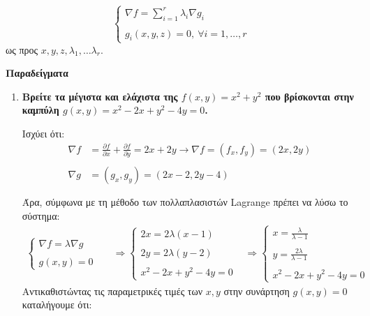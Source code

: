 \[
\begin{cases} 
\nabla f = \sum_{i=1}^{r} \lambda_i \nabla g_i \\ \\
g_i(x,y,z) = 0, \ \forall i=1,\dots,r 
\end{cases}
\]
ως προς $x,y,z,\lambda_1, \dots \lambda_r$.

\textbf{Παραδείγματα}\\

\begin{enumerate}
    \item\textbf{ Βρείτε τα μέγιστα και ελάχιστα της $f(x,y) = x^2 + y^2$ που βρίσκονται στην καμπύλη $g(x,y) = x^2 - 2x + y^2 - 4y = 0$.}
    
        Ισχύει ότι:
        \begin{align*}
            \nabla f & = \frac{\partial f}{\partial x} + \frac{\partial f}{\partial y} = 2x + 2y \longrightarrow \nabla f = (f_x, f_y) = (2x,2y) \\\\
            \nabla g & = (g_x, g_y) = (2x-2, 2y-4) \\\\
        \end{align*}
        Άρα, σύμφωνα με τη μέθοδο των πολλαπλασιστών Lagrange πρέπει να λύσω το σύστημα:
        \begin{align*}
            \begin{cases}
                \nabla f = \lambda \nabla g \\\\
                g(x,y) = 0
            \end{cases} &&\Rightarrow
            \begin{cases}
                2x = 2\lambda (x-1) \\\\
                2y = 2\lambda (y-2) \\\\
                x^2 -2x + y^2 - 4y = 0
            \end{cases} &\Rightarrow
            \begin{cases}
                x = \frac{\lambda}{\lambda - 1} \\\\
                y = \frac{2\lambda}{\lambda - 1} \\\\
                x^2 -2x + y^2 - 4y = 0
            \end{cases}
        \end{align*}
        Αντικαθιστώντας τις παραμετρικές τιμές των $x,y$ στην συνάρτηση $g(x,y) = 0$ καταλήγουμε ότι:
        

\end{enumerate}
